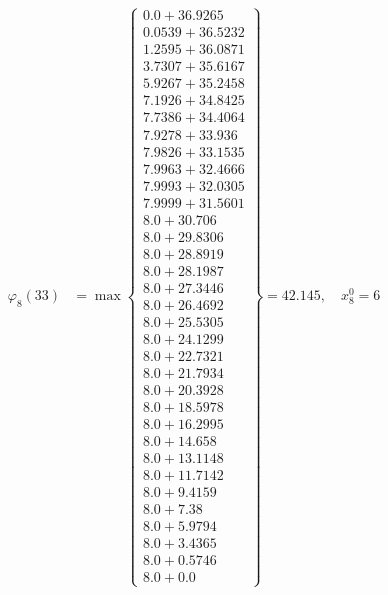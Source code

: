 \documentclass{article}
\begin{document}
\begin{align*}
\varphi_{8}(33) &= \max \left\{ \begin{array}{c}
0.0 + 36.9265 \\
 0.0539 + 36.5232 \\
 1.2595 + 36.0871 \\
 3.7307 + 35.6167 \\
 5.9267 + 35.2458 \\
 7.1926 + 34.8425 \\
 7.7386 + 34.4064 \\
 7.9278 + 33.936 \\
 7.9826 + 33.1535 \\
 7.9963 + 32.4666 \\
 7.9993 + 32.0305 \\
 7.9999 + 31.5601 \\
 8.0 + 30.706 \\
 8.0 + 29.8306 \\
 8.0 + 28.8919 \\
 8.0 + 28.1987 \\
 8.0 + 27.3446 \\
 8.0 + 26.4692 \\
 8.0 + 25.5305 \\
 8.0 + 24.1299 \\
 8.0 + 22.7321 \\
 8.0 + 21.7934 \\
 8.0 + 20.3928 \\
 8.0 + 18.5978 \\
 8.0 + 16.2995 \\
 8.0 + 14.658 \\
 8.0 + 13.1148 \\
 8.0 + 11.7142 \\
 8.0 + 9.4159 \\
 8.0 + 7.38 \\
 8.0 + 5.9794 \\
 8.0 + 3.4365 \\
 8.0 + 0.5746 \\
 8.0 + 0.0
\end{array} \right\}=42.145, \quad x_{8}^0=6\\
  

\end{align*}
\end{document}
